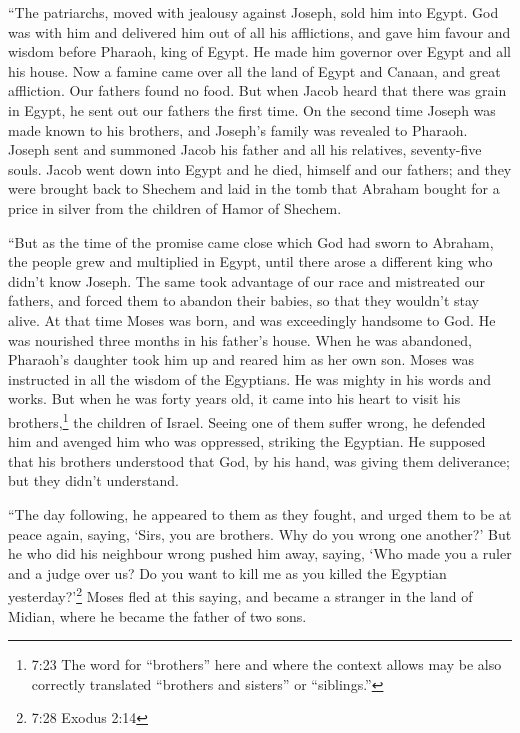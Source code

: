  ``The patriarchs, moved with jealousy against Joseph, sold
him into Egypt. God was with him  and delivered him out of
all his afflictions, and gave him favour and wisdom before Pharaoh, king
of Egypt. He made him governor over Egypt and all his house.
 Now a famine came over all the land of Egypt and Canaan,
and great affliction. Our fathers found no food.  But when
Jacob heard that there was grain in Egypt, he sent out our fathers the
first time.  On the second time Joseph was made known to
his brothers, and Joseph's family was revealed to Pharaoh. 
Joseph sent and summoned Jacob his father and all his relatives,
seventy-five souls.  Jacob went down into Egypt and he
died, himself and our fathers;  and they were brought back
to Shechem and laid in the tomb that Abraham bought for a price in
silver from the children of Hamor of Shechem.

 ``But as the time of the promise came close which God had
sworn to Abraham, the people grew and multiplied in Egypt, 
until there arose a different king who didn't know Joseph. 
The same took advantage of our race and mistreated our fathers, and
forced them to abandon their babies, so that they wouldn't stay alive.
 At that time Moses was born, and was exceedingly handsome
to God. He was nourished three months in his father's house.
 When he was abandoned, Pharaoh's daughter took him up and
reared him as her own son.  Moses was instructed in all the
wisdom of the Egyptians. He was mighty in his words and works.
 But when he was forty years old, it came into his heart to
visit his brothers,\footnote{7:23 The word for ``brothers'' here and
  where the context allows may be also correctly translated ``brothers
  and sisters'' or ``siblings.''} the children of Israel. 
Seeing one of them suffer wrong, he defended him and avenged him who was
oppressed, striking the Egyptian.  He supposed that his
brothers understood that God, by his hand, was giving them deliverance;
but they didn't understand.

 ``The day following, he appeared to them as they fought,
and urged them to be at peace again, saying, `Sirs, you are brothers.
Why do you wrong one another?'  But he who did his
neighbour wrong pushed him away, saying, `Who made you a ruler and a
judge over us?  Do you want to kill me as you killed the
Egyptian yesterday?'\footnote{7:28 Exodus 2:14}  Moses fled
at this saying, and became a stranger in the land of Midian, where he
became the father of two sons.

